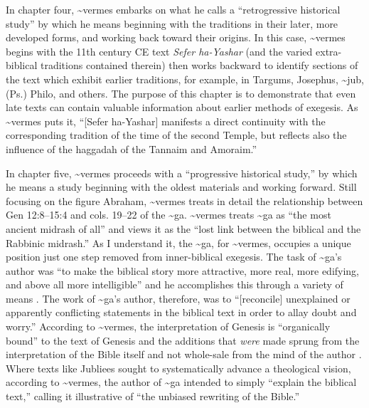 In chapter four, \textasciitilde{}vermes embarks on what he calls a
``retrogressive historical study'' by which he means beginning with the
traditions in their later, more developed forms, and working back toward
their origins. In this case, \textasciitilde{}vermes begins with the
11th century CE text \emph{Sefer ha-Yashar} (and the varied
extra-biblical traditions contained therein) then works backward to
identify sections of the text which exhibit earlier traditions, for
example, in Targums, Josephus, \textasciitilde{}jub, (Ps.) Philo, and
others. The purpose of this chapter is to demonstrate that even late
texts can contain valuable information about earlier methods of
exegesis. As \textasciitilde{}vermes puts it, ``{[}Sefer ha-Yashar{]}
manifests a direct continuity with the corresponding tradition of the
time of the second Temple, but reflects also the influence of the
haggadah of the Tannaim and Amoraim.''\autocite[95]{vermes1961}

In chapter five, \textasciitilde{}vermes proceeds with a ``progressive
historical study,'' by which he means a study beginning with the oldest
materials and working forward. Still focusing on the figure Abraham,
\textasciitilde{}vermes treats in detail the relationship between Gen
12:8--15:4 and cols. 19--22 of the \textasciitilde{}ga.
\textasciitilde{}vermes treats \textasciitilde{}ga as ``the most ancient
midrash of all''\autocite[124]{vermes1961} and views it as the ``lost
link between the biblical and the Rabbinic midrash.''
\autocite[124]{vermes1961} As I understand it, the \textasciitilde{}ga,
for \textasciitilde{}vermes, occupies a unique position just one step
removed from inner-biblical exegesis. The task of \textasciitilde{}ga's
author was ``to make the biblical story more attractive, more real, more
edifying, and above all more intelligible'' and he accomplishes this
through a variety of means \autocite[125]{vermes1961}. The work of
\textasciitilde{}ga's author, therefore, was to ``{[}reconcile{]}
unexplained or apparently conflicting statements in the biblical text in
order to allay doubt and worry.''\autocite[125]{vermes1961} According to
\textasciitilde{}vermes, the interpretation of Genesis is ``organically
bound'' to the text of Genesis and the additions that \emph{were} made
sprung from the interpretation of the Bible itself and not whole-sale
from the mind of the author \autocite[126]{vermes1961}. Where texts like
Jubliees sought to systematically advance a theological vision,
according to \textasciitilde{}vermes, the author of \textasciitilde{}ga
intended to simply ``explain the biblical text,'' calling it
illustrative of ``the unbiased rewriting of the
Bible.''\autocite[126]{vermes1961}

